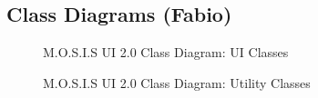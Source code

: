 \subsection{Class Diagrams (Fabio)}
\begin{landscape}
\begin{figure}[H]
	\caption{M.O.S.I.S UI 2.0 Class Diagram: UI Classes}
\end{figure}
\end{landscape}
\begin{figure}[H]
	\caption{M.O.S.I.S UI 2.0 Class Diagram: Utility Classes}
\end{figure}